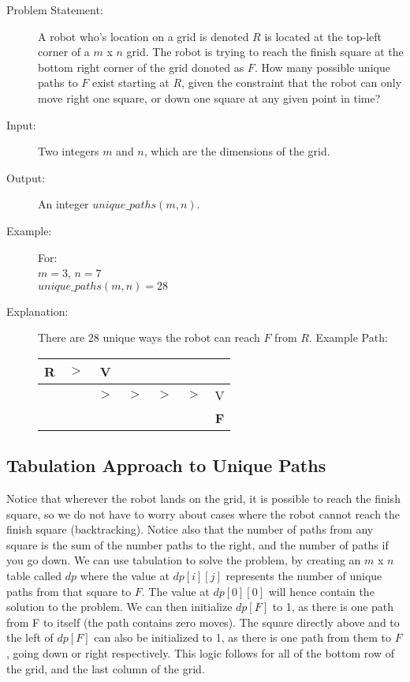 \begin{description}
    \item[Problem Statement:]
        A robot who's location on a grid is denoted $R$ is located at the top-left corner of a $m$ x $n$ grid.
        The robot is trying to reach the finish square at the bottom right corner of the grid donoted as $F$.
        How many possible unique paths to $F$ exist starting at $R$, given the constraint that the robot can only move right one square, or down one square at any given point in time?
        
    \item[Input:]
        Two integers $m$ and $n$, which are the dimensions of the grid.
        
    \item[Output:] 
        An integer $unique\_paths(m,n)$.
        
    \item[Example:] For:\\
        $m = 3$, $n = 7$\\
        $unique\_paths(m,n) = 28$
        
    \item[Explanation:]
        There are 28 unique ways the robot can reach $F$ from $R$.
        Example Path:

        \begin{table}[htbp]
            \centering
            \begin{tabular}{|c|c|c|c|c|c|c|}
                \hline
                \textbf{R} & $>$ & V &  &  &  &  \\
                \hline
                 &  & $>$ & $>$ & $>$ & $>$ & V \\
                \hline
                 &  &  &  &  &  & \textbf{F} \\
                \hline
            \end{tabular}
        \end{table}

        
\end{description}

\subsection{Tabulation Approach to Unique Paths}
Notice that wherever the robot lands on the grid, it is possible to reach the finish square,
so we do not have to worry about cases where the robot cannot reach the finish square (backtracking).
Notice also that the number of paths from any square is the sum of the number paths to the right, and the number of paths if you go down.
We can use tabulation to solve the problem, by creating an $m$ x $n$ table called $dp$ where the value at $dp[i][j]$ represents the number of unique paths from that square to $F$.
The value at $dp[0][0]$ will hence contain the solution to the problem.
We can then initialize $dp[F]$ to 1, as there is one path from F to itself (the path contains zero moves).
The square directly above and to the left of $dp[F]$ can also be initialized to 1, as there is one path from them to $F$, going down or right respectively. This logic follows for all of the bottom row of the grid, and the last column of the grid.

